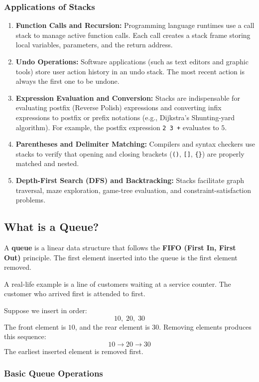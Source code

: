 \subsubsection{Applications of Stacks}
\begin{enumerate}
    \item \textbf{Function Calls and Recursion:} Programming language runtimes use a call stack to manage active function calls. Each call creates a stack frame storing local variables, parameters, and the return address.
    \item \textbf{Undo Operations:} Software applications (such as text editors and graphic tools) store user action history in an undo stack. The most recent action is always the first one to be undone.
    \item \textbf{Expression Evaluation and Conversion:} Stacks are indispensable for evaluating postfix (Reverse Polish) expressions and converting infix expressions to postfix or prefix notations (e.g., Dijkstra's Shunting-yard algorithm). For example, the postfix expression \texttt{2 3 +} evaluates to $5$.
    \item \textbf{Parentheses and Delimiter Matching:} Compilers and syntax checkers use stacks to verify that opening and closing brackets (\texttt{()}, \texttt{[]}, \texttt{\{\}}) are properly matched and nested.
    \item \textbf{Depth-First Search (DFS) and Backtracking:} Stacks facilitate graph traversal, maze exploration, game-tree evaluation, and constraint-satisfaction problems.
\end{enumerate}

\subsection{What is a Queue?}

A \textbf{queue} is a linear data structure that follows the \textbf{FIFO (First In, First Out)} principle. The first element inserted into the queue is the first element removed.

A real-life example is a line of customers waiting at a service counter. The customer who arrived first is attended to first.

Suppose we insert in order:
\[
10, \; 20, \; 30
\]
The front element is $10$, and the rear element is $30$. Removing elements produces this sequence:
\[
10 \longrightarrow 20 \longrightarrow 30
\]
The earliest inserted element is removed first.

\subsubsection{Basic Queue Operations}

